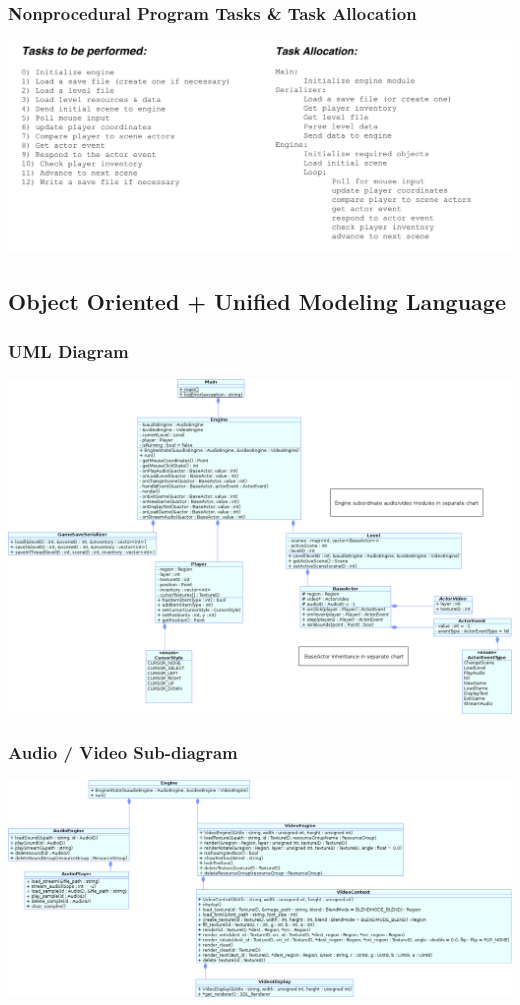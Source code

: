 \documentclass{article}
\begin{document}
		\subsubsection{Nonprocedural Program Tasks \& Task Allocation}
			\begin{center}
				\includegraphics[scale=0.74,angle=90]{Jackson34.png}
			\end{center}
	\subsection{Object Oriented + Unified Modeling Language}
		\subsubsection{UML Diagram}
			\begin{center}
				\includegraphics[scale=0.49,angle=90]{MainClasses.png}
			\end{center}
    \subsubsection{Audio / Video Sub-diagram}
      \begin{center}
				\includegraphics[scale=0.50,angle=90]{AudioVideoClasses.png}
      \end{center}
\end{document}
